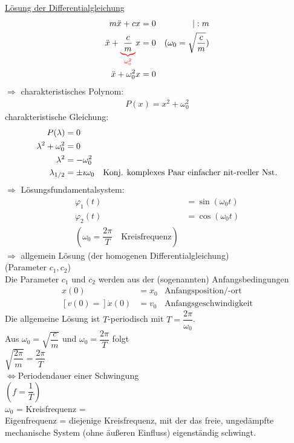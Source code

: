 \begin{enumerate}[A]
	\ul{Lösung der Differentialgleichung}
	\begin{align*}
	m\ddot{x}+cx&=0&|:m\\
	\ddot{x}+\redunderbrace{\dfrac{c}{m}}{\omega_0^2}x&=0&(\omega_0=\sqrt{\dfrac{c}{m}})\\
	\ddot{x}+\omega_0^2x&=0
	\end{align*}
	$\Rightarrow$ charakteristisches Polynom:
	\begin{align*}
	P(x)=x^2+\omega_0^2
	\end{align*}
	charakteristische Gleichung:
	\begin{align*}
	P(\lambda)&=0\\
	\lambda^2+\omega_0^2&=0\\
	\lambda^2&=-\omega_0^2\\
	\lambda_{1/2}&=\pm\imath\omega_0&\text{Konj. komplexes Paar einfacher nit-reeller Nst.}
	\end{align*}
	$\Rightarrow$ Lösungsfundamentalsystem:
	\begin{align*}
	\varphi_1(t)&=\sin(\omega_0t)\\
	\varphi_2(t)&=\cos(\omega_0t)\\
	(\omega_0=\dfrac{2\pi}{T}\quad\text{Kreisfrequenz})
	\end{align*}
	$\Rightarrow$ allgemein Lösung (der homogenen Differentialgleichung)\\
	\hhspace{2cm}\qquad(Parameter $c_1,c_2$)\\
	Die Parameter $c_1$ und $c_2$ werden aus der (sogenannten) Anfangsbedingungen\\
	\begin{align*}
	x(0)&=x_0&\text{Anfangsposition/-ort}\\
	[v(0)=]\dot{x}(0)&=v_0&\text{Anfangsgeschwindigkeit}
	\end{align*}
	Die allgemeine Lösung ist $T$-periodisch mit $T=\dfrac{2\pi}{\omega_0}$.\\
	Aus $\omega_0=\sqrt{\dfrac{c}{m}}$ und $\omega_0=\dfrac{2\pi}{T}$ folgt\\
	\hhspace{2cm}$\sqrt{\dfrac{2\pi}{m}}=\dfrac{2\pi}{T}$\\
	\hhspace{2cm}$\Leftrightarrow$\qquad Periodendauer einer Schwingung\\
	\hhspace{2cm}\qquad$(f=\dfrac{1}{T})$\\
	$\omega_0$ = Kreisfrequenz = \\
	Eigenfrequenz = diejenige Kreisfrequenz, mit der das freie, ungedämpfte mechanische System (ohne äußeren Einfluss) eigenständig schwingt.
	

\end{enumerate}
